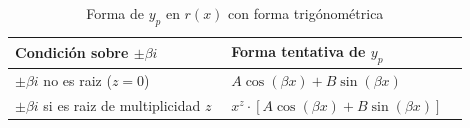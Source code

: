\begin{table}[H]
\centering
\caption{Forma de $y_{p}$ en $r(x)$ con forma trigónométrica}
\label{tab:eq_trigonométrica}
\begin{threeparttable}
{
\begin{tabular}{p{0.45\linewidth}p{0.45\linewidth}}\hline

    \textbf{Condición sobre $\pm \beta i$} & \textbf{Forma tentativa de $y_{p}$} \\ \hline

    $\pm \beta i$ no es raiz ($z = 0$) & $A \cos{(\beta x)} + B \sin{(\beta x)}$ \\
    $\pm \beta i$ si es raiz de multiplicidad $z$ & $x^{z} \cdot [A \cos{(\beta x)} + B \sin{(\beta x)}]$ \\
    
    \hline
\end{tabular}
}
\begin{tablenotes} %
    \item[] 
\end{tablenotes}
\end{threeparttable}
\end{table}